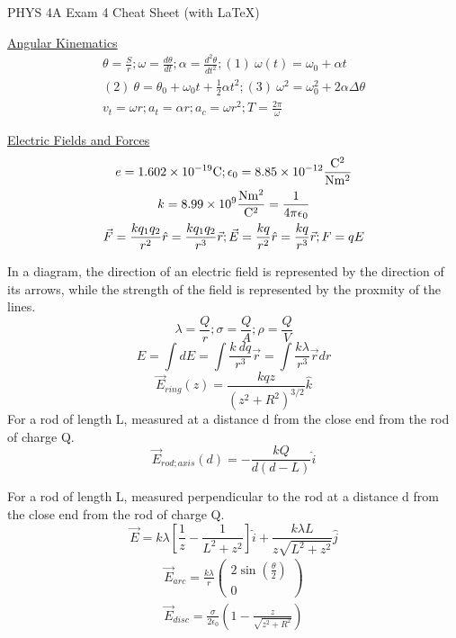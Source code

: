 \documentclass[8pt]{minimal}
\begin{document}
\setlength{\parindent}{0pt}
\setlength{\columnsep}{1cm}
\twocolumn
PHYS 4A Exam 4 Cheat Sheet (with \LaTeX)

\underline{Angular Kinematics}
\begin{gather*}
    \theta = \frac{S}{r}; \omega = \frac{d\theta}{dt}; \alpha = \frac{d^2\theta}{dt^2}; (1)\ \omega(t) = \omega_0 + \alpha t\\
    (2)\ \theta = \theta_0 + \omega_0t + \frac{1}{2}\alpha t^2; (3)\ \omega^2 = \omega_0^2 + 2\alpha\Delta\theta\\
    v_t = \omega r; a_t = \alpha r; a_c = \omega r^2; T = \frac{2 \pi}{\omega}
\end{gather*}

\underline{Electric Fields and Forces}
\begin{gather*}
    e = 1.602 \times 10^{-19} \unit{\coulomb}; \epsilon_0 = 8.85 \times 10^{-12} \unit{\frac{\coulomb^2}{\newton\meter^2}}\\
    k = 8.99 \times 10^9 \unit{\frac{\newton\meter^2}{\coulomb^2}}= \frac{1}{4\pi\epsilon_0}\\
    \vec{F} = \frac{kq_1q_2}{r^2}\hat{r} = \frac{kq_1q_2}{r^3}\vec{r};
    \vec{E} = \frac{kq}{r^2}\hat{r} = \frac{kq}{r^3}\vec{r}; F = qE
\end{gather*}

In a diagram, the direction of an electric field is represented by the direction of its arrows, while the strength of the field is represented by the proxmity of the lines.
\[\lambda = \frac{Q}{r} ; \sigma = \frac{Q}{A} ; \rho = \frac{Q}{V}\]
\[E = \int dE = \int \frac{k\ dq}{r^3}\vec{r} = \int \frac{k \lambda}{r^3}\vec{r}dr\]
\[ \vec{E}_{ring}(z) = \frac{kqz}{(z^2 + R^2)^{3/2}}\hat{k} \]
For a rod of length L, measured at a distance d from the close end from the rod of charge Q.
\[ \vec{E}_{rod;axis}(d) = -\frac{kQ}{d(d-L)}\hat{i} \]

For a rod of length L, measured perpendicular to the rod at a distance d from the close end from the rod of charge Q.
\[\vec{E} = k\lambda \left[ \frac{1}{z} - \frac{1}{L^2 + z^2} \right]\hat{i} + \frac{k\lambda L}{z\sqrt{L^2 + z^2}} \hat{j}\]
\begin{gather*}
    \vec{E}_{arc} = \frac{k\lambda}{r} \begin{pmatrix}2\sin(\frac{\theta}{2})\\0\end{pmatrix}\\
    \vec{E}_{disc} = \frac{\sigma}{2\epsilon_0} \left(1 - \frac{z}{\sqrt{z^2 + R^2}}\right)
\end{gather*}
\end{document}
